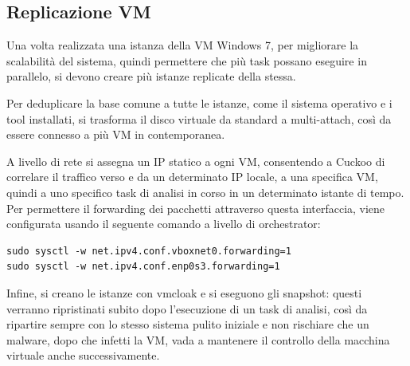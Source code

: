\subsection{Replicazione VM}
\label{chap:dynamic-vm-replication}
Una volta realizzata una istanza della VM Windows 7, per migliorare la scalabilità del sistema,
quindi permettere che più task possano eseguire in parallelo, 
si devono creare più istanze replicate della stessa.

Per deduplicare la base comune a tutte le istanze, come il sistema operativo e i tool installati, si trasforma il disco virtuale da standard a multi-attach, così da essere connesso a più VM in contemporanea.

A livello di rete si assegna un IP statico a ogni VM, consentendo a Cuckoo di correlare il traffico verso e da un determinato IP locale, a una specifica VM, quindi a uno specifico task di analisi in corso in un determinato istante di tempo.
Per permettere il forwarding dei pacchetti attraverso questa interfaccia, viene configurata usando il seguente comando a livello di orchestrator:
\begin{verbatim}
sudo sysctl -w net.ipv4.conf.vboxnet0.forwarding=1
sudo sysctl -w net.ipv4.conf.enp0s3.forwarding=1
\end{verbatim}

Infine, si creano le istanze con vmcloak e si eseguono gli snapshot: questi verranno ripristinati subito dopo l'esecuzione di un task di analisi, così da ripartire sempre con lo stesso sistema pulito iniziale e non rischiare che un malware, dopo che infetti la VM, vada a mantenere il controllo della macchina virtuale anche successivamente.

